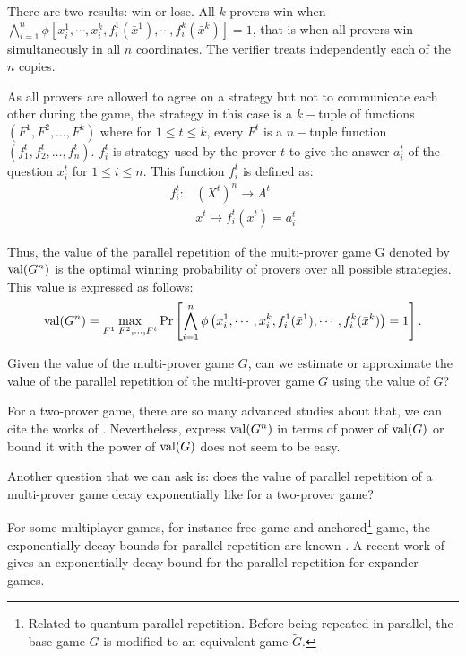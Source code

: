 There are two results: win or lose. All $k$ provers win when $ \bigwedge\limits_{i=1}^n \phi [x_i^1, \cdots , x_i^k, f_i^1(\bar{x}^1), \cdots ,  f_i^k(\bar{x}^k)]=1$, that is when all provers win simultaneously in all $n$ coordinates. The verifier treats independently each of the $n$ copies. 

As  all provers are allowed to agree on a strategy but not to communicate each other during the game, the strategy in this case is a $k-$tuple of functions $(F^1,F^2, \ldots, F^k)$ where for $1\leq t \leq k$, every $F^t$ is a $n-$tuple function $(f_1^t, f_2^t, \ldots, f_n^t)$. $f_i^t$ is strategy used by the prover $t$ to give the answer $a_i^t$ of the question $x_i^t$ for $1\leq i \leq n$. This function $f_i^t$ is defined as:
\begin{align*}
f_i^t: & (X^t)^n \longrightarrow A^t \\ & \bar{x}^t \longmapsto f_i^t(\bar{x}^t)=a_i^t
\end{align*}

Thus, the value of the parallel repetition of the multi-prover game G denoted by $\mathrm{val}(G^n)$ is the optimal winning probability of provers over all possible strategies. This value is expressed as follows: 
$$ \mathrm{val} (G^n)= \max_{F^1,F^2, \ldots, F^t} \Pr \left[  \bigwedge\limits_{i=1}^n \phi \left( x_i^1, \cdots , x_i^k, f_i^1(\bar{x}^1), \cdots ,  f_i^k(\bar{x}^k) \right)=1 \right].$$


Given the value of the multi-prover game $G$, can we estimate or approximate the value of the parallel repetition of the multi-prover game $G$ using the value of $G$? 

For a two-prover game, there are so many advanced studies about that, we can cite the works of \cite{feige1992two, verbitsky1996towards,raz1998parallel, holenstein2007parallel, barak2009strong,raz2010parallel, rao2011parallel,dinur2014analytical}.  Nevertheless, express $\mathrm{val} (G^n)$  in terms of power of $\mathrm{val} (G)$ or bound it with the power of $\mathrm{val} (G)$ does not seem to be easy.

 Another question that we can ask is: does the value of parallel repetition of a multi-prover game decay exponentially like for a two-prover game?

For some multiplayer games, for instance free game and anchored\footnote{ Related to quantum parallel repetition. Before being repeated in parallel, the base game $G$ is modified to an equivalent game $\tilde{G}$.} game, the exponentially decay bounds for parallel repetition are known \citep{barak2009strong,bavarian2015anchoring}.  A recent work of \cite{dinur2016multiplayer} gives an exponentially decay bound for the parallel repetition for  expander games. 

